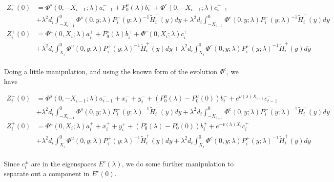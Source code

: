 \documentclass[12pt]{article}
\begin{document}
\begin{align*}
Z_i^-(0) &= \Phi^s(0, -X_{i-1}; \lambda) a_{i-1}^- + P_0^u(\lambda) b_i^- + \Phi^c(0, -X_{i-1}; \lambda) c_{i-1}^- \\
&+ \lambda^2 d_i \int_{-X_{i-1}}^0 \Phi^s(0, y; \lambda) P_i^-(y; \lambda)^{-1} \tilde{H}_i^-(y) dy 
+ \lambda^2 d_i \int_{-X_{i-1}}^0 \Phi^c(0, y; \lambda) P_i^-(y; \lambda)^{-1} \tilde{H}_i^-(y) dy  \\ 
Z_i^+(0) &= \Phi^u(0, X_i; \lambda) a_i^+ + P_0^s(\lambda) b_i^+ + \Phi^c(0, X_i; \lambda) c_i^+ \\
&+ \lambda^2 d_i \int_{X_i}^0 \Phi^u(0, y; \lambda) P_i^+(y; \lambda)^{-1} \tilde{H}_i^+(y) dy 
+ \lambda^2 d_i \int_{X_i}^0 \Phi^c(0, y; \lambda) P_i^+(y; \lambda)^{-1} \tilde{H}_i^+(y) dy \\
\end{align*}

Doing a little manipulation, and using the known form of the evolution $\Phi^c$, we have

\begin{align*}
Z_i^-(0) &= \Phi^s(0, -X_{i-1}; \lambda) a_{i-1}^- + x_i^- + y_i^- + (P_0^u(\lambda) - P_0^u(0))b_i^- + e^{\nu(\lambda) X_{i-1}} c_{i-1}^- \\
&+ \lambda^2 d_i \int_{-X_{i-1}}^0 \Phi^s(0, y; \lambda) P_i^-(y; \lambda)^{-1} \tilde{H}_i^-(y) dy 
+ \lambda^2 d_i \int_{-X_{i-1}}^0 \Phi^c(0, y; \lambda) P_i^-(y; \lambda)^{-1} \tilde{H}_i^-(y) dy  \\ 
Z_i^+(0) &= \Phi^u(0, X_i; \lambda) a_i^+ + x_i^+ + y_i^+ + (P_0^s(\lambda) - P_0^s(0)) b_i^+ + e^{-\nu(\lambda)X_i} c_i^+ \\
&+ \lambda^2 d_i \int_{X_i}^0 \Phi^u(0, y; \lambda) P_i^+(y; \lambda)^{-1} \tilde{H}_i^+(y) dy 
+ \lambda^2 d_i \int_{X_i}^0 \Phi^c(0, y; \lambda) P_i^+(y; \lambda)^{-1} \tilde{H}_i^+(y) dy \\
\end{align*}

Since $c_i^\pm$ are in the eigenspaces $E^c(\lambda)$, we do some further manipulation to separate out a component in $E^c(0)$.
\end{document}
